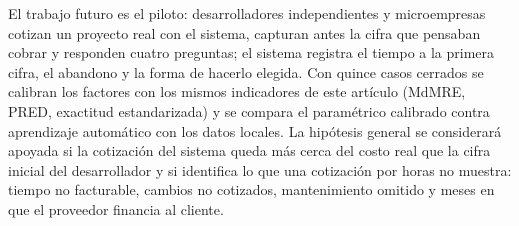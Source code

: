 \documentclass[10pt,twocolumn]{article}
\begin{document}
El trabajo futuro es el piloto: desarrolladores independientes y microempresas cotizan un proyecto real con el sistema, capturan antes la cifra que pensaban cobrar y responden cuatro preguntas; el sistema registra el tiempo a la primera cifra, el abandono y la forma de hacerlo elegida. Con quince casos cerrados se calibran los factores con los mismos indicadores de este artículo (MdMRE, PRED, exactitud estandarizada) y se compara el paramétrico calibrado contra aprendizaje automático con los datos locales. La hipótesis general se considerará apoyada si la cotización del sistema queda más cerca del costo real que la cifra inicial del desarrollador y si identifica lo que una cotización por horas no muestra: tiempo no facturable, cambios no cotizados, mantenimiento omitido y meses en que el proveedor financia al cliente.



\end{document}
